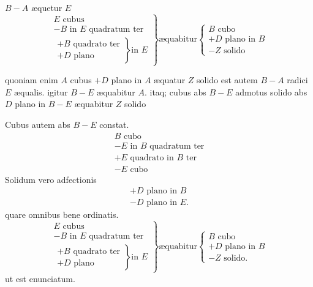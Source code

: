 \documentclass[11pt,a4paper]{article}
\begin{document}
$B - A$ æquetur $E$
\[ \left.\begin{array}{l} E \text{ cubus} \\ - B \text{ in } E \text{ quadratum ter} \\ \left.\begin{array}{l} + B \text{ quadrato ter} \\ + D \text{ plano} \end{array}\right\} \text{in } E \end{array}\right\} \text{æquabitur} \left\{\begin{array}{l} B \text{ cubo} \\ + D \text{ plano in } B \\ - Z \text{ solido} \end{array}\right. \]

quoniam enim $A$ cubus $+ D$ plano in $A$ æquatur $Z$ solido est autem $B - A$ radici $E$ æqualis. igitur $B - E$ æquabitur $A$. itaq; cubus abs $B - E$ admotus solido abs $D$ plano in $B - E$ æquabitur $Z$ solido

Cubus autem abs $B - E$ constat.
\[ \begin{array}{l} B \text{ cubo} \\ - E \text{ in } B \text{ quadratum ter} \\ + E \text{ quadrato in } B \text{ ter} \\ - E \text{ cubo} \end{array} \]
Solidum vero adfectionis
\[ \begin{array}{l} + D \text{ plano in } B \\ - D \text{ plano in } E. \end{array} \]
quare omnibus bene ordinatis.
\[ \left.\begin{array}{l} E \text{ cubus} \\ - B \text{ in } E \text{ quadratum ter} \\ \left.\begin{array}{l} + B \text{ quadrato ter} \\ + D \text{ plano} \end{array}\right\} \text{in } E \end{array}\right\} \text{æquabitur} \left\{\begin{array}{l} B \text{ cubo} \\ + D \text{ plano in } B \\ - Z \text{ solido.} \end{array}\right. \]
ut est enunciatum.
\end{document}
